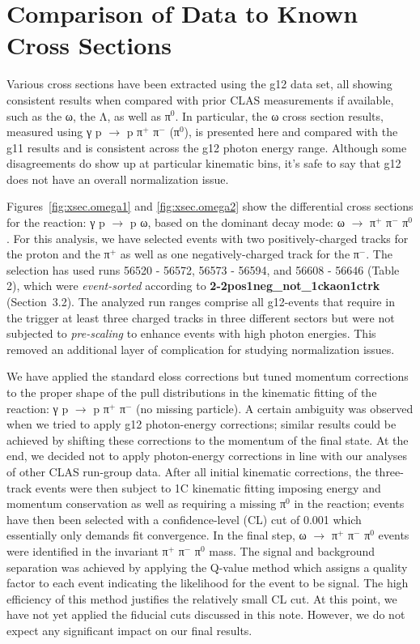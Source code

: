 \section{\label{sec:xsec}Comparison of Data to Known Cross Sections}

Various cross sections have been extracted using the g12 data set, all showing consistent results when compared with prior CLAS measurements if available, such as the ω, the Λ, as well as π$^0$. In particular, the ω cross section results, measured using γ p $\rightarrow$ p π$^+$ π$^-$ (π$^0$), is presented here and compared with the g11 results and is consistent across the g12 photon energy range. Although some disagreements do show up at particular kinematic bins, it's safe to say that g12 does not have an overall normalization issue.

Figures~\ref{fig:xsec.omega1} and \ref{fig:xsec.omega2} show the differential cross sections for the reaction: γ p $\rightarrow$ p ω, based on the dominant decay mode: ω $\rightarrow$ π$^+$ π$^-$ π$^0$. For this analysis, we have selected events with two positively-charged tracks for the proton and the π$^+$ as well as one negatively-charged track for the π$^-$. The selection has used runs 56520 - 56572, 56573 - 56594, and 56608 - 56646 (Table 2), which were {\it event-sorted} according to {\bf 2-2pos1neg\_not\_1ckaon1ctrk} (Section~3.2). The analyzed run ranges comprise all g12-events that require in the trigger at least three charged tracks in three different sectors but were not subjected to {\it pre-scaling} to enhance events with high photon energies. This removed an additional layer of complication for studying normalization issues.

We have applied the standard {\sc eloss} corrections but tuned momentum corrections to the proper shape of the pull distributions in the kinematic fitting of the reaction: γ p $\rightarrow$ p π$^+$ π$^-$ (no missing particle). A certain ambiguity was observed when we tried to apply g12 photon-energy corrections; similar results could be achieved by shifting these corrections to the momentum of the final state. At the end, we decided not to apply photon-energy corrections in line with our analyses of other CLAS run-group data. After all initial kinematic corrections, the three-track events were then subject to 1C kinematic fitting imposing energy and momentum conservation as well as requiring a missing π$^0$ in the reaction; events have then been selected with a confidence-level (CL) cut of 0.001 which essentially only demands fit convergence. In the final step, ω $\rightarrow$ π$^+$ π$^-$ π$^0$ events were identified in the invariant π$^+$ π$^-$ π$^0$ mass. The signal and background separation was achieved by applying the Q-value method which assigns a quality factor to each event indicating the likelihood for the event to be signal. The high efficiency of this method justifies the relatively small CL cut. At this point, we have not yet applied the fiducial cuts discussed in this note. However, we do not expect any significant impact on our final results.

